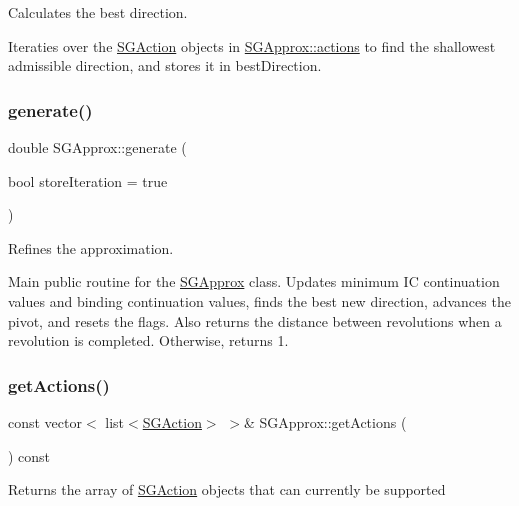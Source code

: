 Calculates the best direction. 

Iteraties over the \hyperlink{classSGAction}{S\+G\+Action} objects in \hyperlink{classSGApprox_a0fccecf0f5dbe7e9288e47182f180879}{S\+G\+Approx\+::actions} to find the shallowest admissible direction, and stores it in best\+Direction. \mbox{\label{classSGApprox_a9cf7330f7cab3f454b0850e778d132fa}} 
\subsubsection{\texorpdfstring{generate()}{generate()}}
{\footnotesize\ttfamily double S\+G\+Approx\+::generate (\begin{DoxyParamCaption}\item[{bool}]{store\+Iteration = {\ttfamily true} }\end{DoxyParamCaption})}



Refines the approximation. 

Main public routine for the \hyperlink{classSGApprox}{S\+G\+Approx} class. Updates minimum IC continuation values and binding continuation values, finds the best new direction, advances the pivot, and resets the flags. Also returns the distance between revolutions when a revolution is completed. Otherwise, returns 1. \mbox{\label{classSGApprox_a067f58141855d9ef683c82a4d649ffd1}} 
\subsubsection{\texorpdfstring{get\+Actions()}{getActions()}}
{\footnotesize\ttfamily const vector$<$ list$<$\hyperlink{classSGAction}{S\+G\+Action}$>$ $>$\& S\+G\+Approx\+::get\+Actions (\begin{DoxyParamCaption}{ }\end{DoxyParamCaption}) const\hspace{0.3cm}{\ttfamily [inline]}}

Returns the array of \hyperlink{classSGAction}{S\+G\+Action} objects that can currently be supported \mbox{\label{classSGApprox_af8eecb492245be11fc1626acd751b37b}} 
